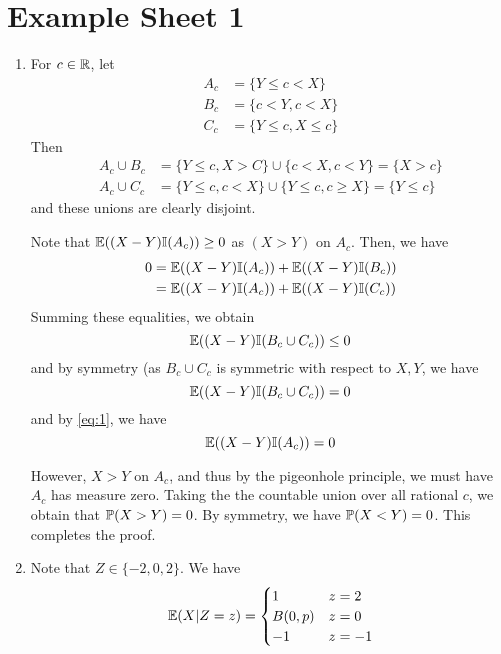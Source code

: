 \chapter{Example Sheet 1}
\label{cha:example-sheet-1}

\begin{enumerate}
\item For $c \in \mathbb{R}$, let
  \begin{align*}
    A_{c} &= \{ Y \leq c < X \} \\
    B_{c} &= \{ c < Y, c < X \} \\
    C_{c} &= \{ Y \leq c, X \leq c \}
  \end{align*}
  Then
  \begin{align*}
    A_{c} \cup B_{c} &= \{ Y \leq c, X > C \} \cup \{ c < X, c < Y \} =
    \{ X > c \} \\
    A_{c} \cup C_{c} &= \{ Y \leq c, c < X \} \cup \{ Y \leq c, c \geq
    X \} = \{ Y \leq c \}
  \end{align*} and these unions are clearly disjoint.

  Note that $\E{(X-Y)\I{A_{c}}} \geq 0$ as $(X > Y)$ on $A_{c}$. Then,
  we have
  \begin{align}
    \label{eq:1}
    0 &= \E{(X - Y)\I{A_{c}}} + \E{(X-Y)\I{B_{c}}} \\
    &= \E{(X-Y)\I{A_{c}}} + \E{(X-Y)\I{C_{c}}}
  \end{align}
  Summing these equalities, we obtain
  \begin{equation}
    \label{eq:2}
    \E{(X-Y)\I{B_{c} \cup C_{c}}} \leq 0
  \end{equation} and by symmetry (as $B_{c} \cup C_{c}$ is symmetric
  with respect to $X, Y$, we have
  \begin{equation}
    \label{eq:3}
    \E{(X-Y)\I{B_{c} \cup C_{c}}} = 0
  \end{equation} and by \eqref{eq:1}, we have
  \begin{equation}
    \label{eq:4}
    \E{(X-Y)\I{A_{c}}} = 0
  \end{equation}

  However, $X > Y$ on $A_{c}$, and thus by the pigeonhole principle,
  we must have $A_{c}$ has measure zero. Taking the the countable
  union over all rational $c$, we obtain that $\Prob{X > Y} = 0$.  By
  symmetry, we have $\Prob{X < Y} = 0$.  This completes the proof.

\item Note that $Z \in \{-2, 0, 2\}$. We have
  \begin{equation}
    \label{eq:5}
    \E{X|Z=z} =
    \begin{cases}
      1 & z = 2 \\
      B(0, p) & z = 0 \\
      -1 & z = -1
    \end{cases}
  \end{equation}


\end{enumerate}
